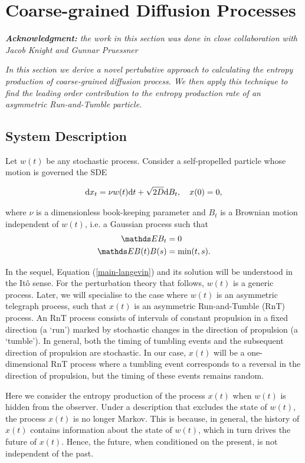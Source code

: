 \section{Coarse-grained Diffusion Processes}\label{chapter:RnT}
\textit{ \textbf{Acknowledgment:} the work in this section was done in close collaboration with Jacob Knight and Gunnar Pruessner}

\textit{In this section we derive a novel pertubative approach to calculating the entropy production of coarse-grained diffusion process. We then apply this technique to find the leading order contribution to the entropy production rate of an asymmetric Run-and-Tumble particle.}
\subsection{System Description}
Let $w(t)$ be any stochastic process. Consider a self-propelled particle whose motion is governed the SDE 

\begin{align}\label{main-langevin}
    \mathrm{d} x_t = \nu w(t)\mathrm{d} t +\sqrt{2D}\mathrm{d} B_t, \quad x(0) = 0,
\end{align}

where $\nu$ is a dimensionless book-keeping parameter and $B_t$ is a Brownian motion independent of $w(t)$, i.e. a Gaussian process such that
\begin{align}\label{white-noise-prop}
\begin{split}
\bE B_t &= 0 \\ 
\bE B(t)B(s) &= \min(t,s).
\end{split}
\end{align}

In the sequel, Equation (\ref{main-langevin}) and its solution will be understood in the It\^{o} sense. For the perturbation theory that follows, $w(t)$ is a generic process. Later, we will specialise to the case where $w(t)$ is an asymmetric telegraph process, such that $x(t)$ is an asymmetric Run-and-Tumble (RnT) process. An RnT process consists of intervals of constant propulsion in a fixed direction (a `run') marked by stochastic changes in the direction of propulsion (a `tumble'). In general, both the timing of tumbling events and the subsequent direction of propulsion are stochastic. In our case, $x(t)$ will be a one-dimensional RnT process where a tumbling event corresponds to a reversal in the direction of propulsion, but the timing of these events remains random. 

Here we consider the entropy production of the process $x(t)$ when $w(t)$ is hidden from the observer. Under a description that excludes the state of $w(t)$, the process $x(t)$ is no longer Markov. This is because, in general, the history of $x(t)$ contains information about the state of $w(t)$, which in turn drives the future of $x(t)$. Hence, the future, when conditioned on the present, is not independent of the past. 

